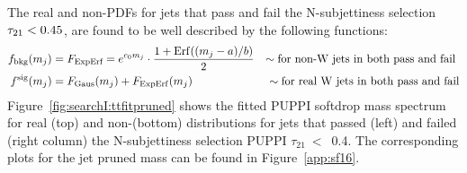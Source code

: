 The real \PW and non-\PW PDFs for jets that pass and fail the N-subjettiness selection $\tau_{21} < 0.45$, are found to be well described by the following functions:
\begin{align*} 
f_{\rm bkg}(m_{j}) &= F_{\textrm{ExpErf}} = e^{c_0m_{j}} \cdot \frac{1 + {\rm Erf}((m_{j}-a)/b)}{2}  &\sim\textrm{for non-\PW jets in both pass and fail }\\
f^{\rm sig}(m_{j}) &= F_{\rm Gaus}(m_{j}) + F_{\rm ExpErf}(m_{j})                                    &\sim\textrm{for real \PW jets in both pass and fail}
\end{align*}
Figure~\ref{fig:searchI:ttfitpruned} shows the fitted PUPPI softdrop mass spectrum for \ttbar real \PW (top) and non-\PW (bottom) distributions for jets that passed (left) and failed (right column) the N-subjettiness selection PUPPI $\tau_{21}~<$~0.4.
The corresponding plots for the jet pruned mass can be found in Figure~\ref{app:sf16}.

